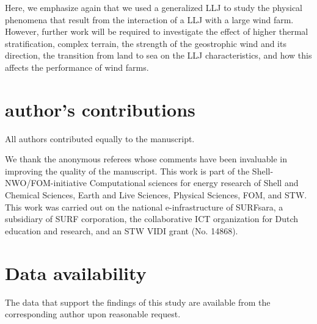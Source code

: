 \documentclass[%
 aip,
 amsmath,amssymb,
reprint,
twocolumn,%
author-numerical,%
]{revtex4-1}
\begin{document}
 Here, we emphasize again that we used a generalized LLJ to study the physical phenomena that result from the interaction of a LLJ with a large wind farm. However, further work will be required to investigate the effect of higher thermal stratification, complex terrain, the strength of the geostrophic wind and its direction, the transition from land to sea on the LLJ characteristics, and how this affects the performance of wind farms.

\section*{author's contributions}
\noindent All authors contributed equally to the manuscript.  

\begin{acknowledgments}
We thank the anonymous referees whose comments have been invaluable in improving the quality of the manuscript. This work is part of the Shell-NWO/FOM-initiative Computational sciences for energy research of Shell and Chemical Sciences, Earth and Live Sciences, Physical Sciences, FOM, and STW. This work was carried out on the national e-infrastructure of SURFsara, a subsidiary of SURF corporation, the collaborative ICT organization for Dutch education and research, and an STW VIDI grant (No. 14868).
\end{acknowledgments}

\section*{Data availability}
\noindent The data that support the findings of this study are available from the corresponding author upon reasonable request.
\end{document}
